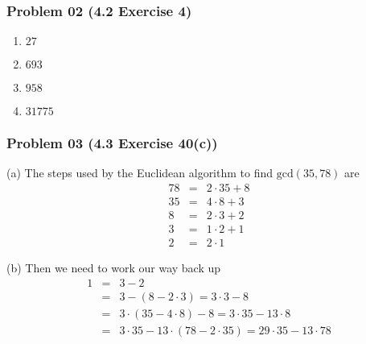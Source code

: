 \documentclass[14pt,hyperref={bookmarks=false}]{beamer}
\begin{document}
	\begin{frame}
	\frametitle{Problem 02 (4.2 Exercise 4)}
	\fontsize{10}{10pt}\selectfont
	\begin{enumerate}[label=(\alph*)]
	\item $27$
	\item $693$
	\item $958$
	\item $31775$
	\end{enumerate}
	\end{frame}
	
	\begin{frame}
	\frametitle{Problem 03 (4.3 Exercise 40(c))}
	\fontsize{9}{10pt}\selectfont
	\setlength{\baselineskip}{5pt}

	(a)	The steps used by the Euclidean algorithm to find $\text{gcd}(35, 78)$ are
	\begin{eqnarray*}
	78 & = & 2 · 35 + 8 \\
	35 & = & 4 · 8 + 3 \\
	8 & = & 2 · 3 + 2  \\
	3 & = & 1 · 2 + 1 \\
	2 & = & 2 · 1
	\end{eqnarray*}

    \vspace*{0.1cm}
    
    (b) Then we need to work our way back up
	\begin{eqnarray*}
	1 & = & 3 − 2                  \\
	~ & = & 3 − (8 - 2 · 3)        =  3 · 3 − 8 \\
	~ & = & 3 · (35 - 4 · 8) -8 =  3 · 35 − 13 · 8 \\
	~ & = & 3 · 35 − 13 · (78 - 2 · 35)  =  29 · 35 − 13 · 78
	\end{eqnarray*}
	\end{frame}
\end{document}
